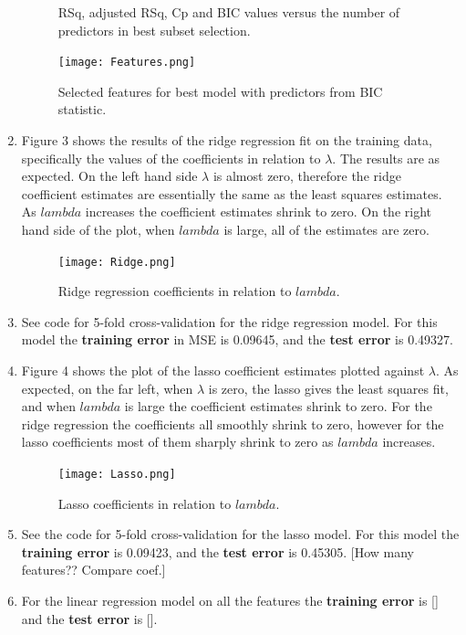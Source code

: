 \begin{enumerate}
\begin{figure}[htbp]
\caption{RSq, adjusted RSq, Cp and BIC values versus the number of predictors in best subset selection.}
\end{figure}
\newline
\begin{figure}[htbp]
\centering
\texttt{[image: Features.png]}
\caption{Selected features for best model with predictors from BIC statistic.}
\end{figure}
\item Figure 3 shows the results of the ridge regression fit on the training data, specifically the values of the coefficients in relation to $\lambda$. The results are as expected. On the left hand side $\lambda$ is almost zero, therefore the ridge coefficient estimates are essentially the same as the least squares estimates. As $lambda$ increases the coefficient estimates shrink to zero. On the right hand side of the plot, when $lambda$ is large, all of the estimates are zero.
\newline
\begin{figure}[htbp]
\centering
\texttt{[image: Ridge.png]}
\caption{Ridge regression coefficients in relation to $lambda$.}
\end{figure}
\item See code for 5-fold cross-validation for the ridge regression model. For this model the \textbf{training error} in MSE is 0.09645, and the \textbf{test error} is 0.49327. 
\item Figure 4 shows the plot of the lasso coefficient estimates plotted against $\lambda$. As expected, on the far left, when $\lambda$ is zero, the lasso gives the least squares fit, and when $lambda$ is large the coefficient estimates shrink to zero. For the ridge regression the coefficients all smoothly shrink to zero, however for the lasso coefficients most of them sharply shrink to zero as $lambda$ increases.    
\newline 
\begin{figure}[htbp]
\centering
\texttt{[image: Lasso.png]}
\caption{Lasso coefficients in relation to $lambda$.}
\end{figure}
\item See the code for 5-fold cross-validation for the lasso model. For this model the \textbf{training error} is 0.09423, and the \textbf{test error} is 0.45305. [How many features?? Compare coef.]
\item For the linear regression model on all the features the \textbf{training error} is [] and the \textbf{test error} is []. 
\end{enumerate}